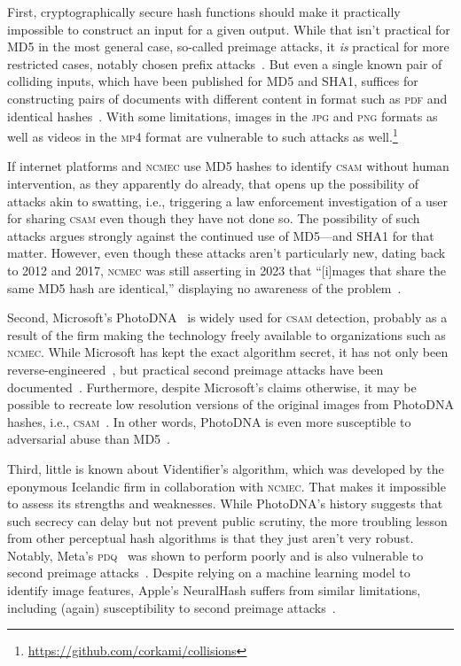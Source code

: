 \documentclass[nonacm,screen]{acmart}
\newcommand\V[1]{\textsc{\MakeLowercase{#1}}}
\begin{document}
First, cryptographically secure hash functions should make it practically
impossible to construct an input for a given output. While that isn't practical
for MD5 in the most general case, so-called preimage attacks, it \emph{is}
practical for more restricted cases, notably chosen prefix
attacks~\cite{StevensLenstraea2012}. But even a single known pair of colliding
inputs, which have been published for MD5 and SHA1, suffices for constructing
pairs of documents with different content in format such as \V{PDF} and
identical hashes~\cite{LeurentPeyrin2020,StevensBurszteinea2017}. With some
limitations, images in the \V{JPG} and \V{PNG} formats as well as videos in the
\V{MP4} format are vulnerable to such attacks as
well.\footnote{\url{https://github.com/corkami/collisions}}

If internet platforms and \V{NCMEC} use MD5 hashes to identify \V{CSAM} without
human intervention, as they apparently do already, that opens up the possibility
of attacks akin to swatting, i.e., triggering a law enforcement investigation of
a user for sharing \V{CSAM} even though they have not done so. The possibility
of such attacks argues strongly against the continued use of MD5---and SHA1 for
that matter. However, even though these attacks aren't particularly new, dating
back to 2012 and 2017, \V{NCMEC} was still asserting in 2023 that ``[i]mages
that share the same MD5 hash are identical,'' displaying no awareness of the
problem~\cite{NCMEC2024}.

Second, Microsoft's PhotoDNA~\cite{Farid2018} is widely used for \V{CSAM}
detection, probably as a result of the firm making the technology freely
available to organizations such as \V{NCMEC}. While Microsoft has kept the exact
algorithm secret, it has not only been reverse-engineered~\cite{Krawetz2021a},
but practical second preimage attacks have been
documented~\cite{ProkosJoisea2021}. Furthermore, despite Microsoft's claims
otherwise, it may be possible to recreate low resolution versions of the
original images from PhotoDNA hashes, i.e., \V{CSAM}~\cite{Athalye2021}. In
other words, PhotoDNA is even more susceptible to adversarial abuse than
MD5~\cite{Steinebach2023}.

Third, little is known about Videntifier's algorithm, which was developed by the
eponymous Icelandic firm in collaboration with \V{NCMEC}. That makes it
impossible to assess its strengths and weaknesses. While PhotoDNA's history
suggests that such secrecy can delay but not prevent public scrutiny, the more
troubling lesson from other perceptual hash algorithms is that they just aren't
very robust. Notably, Meta's \V{PDQ}~\cite{DavisRosen2019} was shown to perform
poorly and is also vulnerable to second preimage
attacks~\cite{Krawetz2022,ProkosJoisea2021}. Despite relying on a machine
learning model to identify image features, Apple's NeuralHash suffers from
similar limitations, including (again) susceptibility to second preimage
attacks~\cite{StruppekHintersdorfea2022}.
\end{document}
